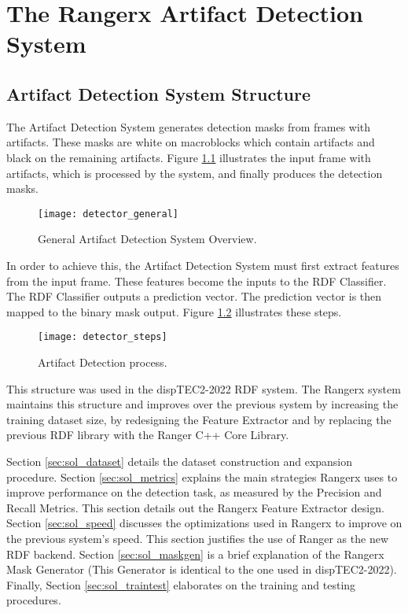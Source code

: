 \chapter{The Rangerx Artifact Detection System}
\label{ch:solucion}

\section{Artifact Detection System Structure}
\label{sec:sol_struct}

The Artifact Detection System generates detection masks from frames with artifacts. These masks are white on macroblocks which contain artifacts and black on the remaining artifacts. Figure \ref{fig:detector_overview} illustrates the input frame with artifacts, which is processed by the system, and finally produces the detection masks.

\begin{figure} [!h]
  \centering
  
  \texttt{[image: detector\_general]}
  
  \caption{General Artifact Detection System Overview. }
  \label{fig:detector_overview}

\end{figure}

In order to achieve this, the Artifact Detection System must first extract features from the input frame. These features become the inputs to the RDF Classifier. The RDF Classifier outputs a prediction vector. The prediction vector is then mapped to the binary mask output. Figure \ref{fig:detector_steps} illustrates these steps.

\begin{figure} [!h]
  \centering
  
  \texttt{[image: detector\_steps]}
  
  \caption{Artifact Detection process. }
  \label{fig:detector_steps}

\end{figure}

This structure was used in the dispTEC2-2022 RDF system. The Rangerx system maintains this structure and improves over the previous system by increasing the training dataset size, by redesigning the Feature Extractor and by replacing the previous RDF library with the Ranger C++ Core Library.

Section \ref{sec:sol_dataset} details the dataset construction and expansion procedure. Section \ref{sec:sol_metrics} explains the main strategies Rangerx uses to improve performance on the detection task, as measured by the Precision and Recall Metrics. This section details out the Rangerx Feature Extractor design. Section \ref{sec:sol_speed} discusses the optimizations used in Rangerx to improve on the previous system's speed. This section justifies the use of Ranger as the new RDF backend. Section \ref{sec:sol_maskgen} is a brief explanation of the Rangerx Mask Generator (This Generator is identical to the one used in dispTEC2-2022). Finally, Section \ref{sec:sol_traintest} elaborates on the training and testing procedures.

